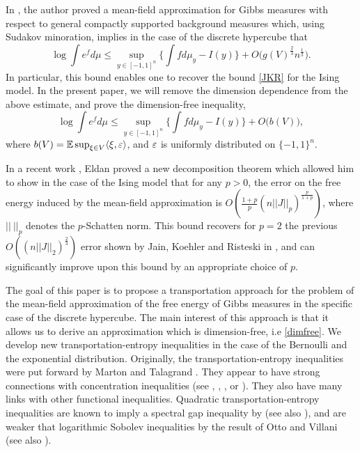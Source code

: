 \documentclass[a4paper,oneside,11pt]{article}
\begin{document}
In \cite{NL}, the author proved a mean-field approximation for Gibbs measures with respect to general compactly supported background measures which, using Sudakov minoration, implies in the case of the discrete hypercube that
$$ \log \int e^{f} d\mu \leq \sup_{ y\in [-1,1]^n} \big\{ \int fd \mu_y - I(y)\big\}  + O\big( g(V)^{\frac{2}{3}} n^{\frac{1}{3}}\big).$$
In particular, this bound enables one to recover the bound \eqref{JKR} for the Ising model. In the present paper, we will remove the dimension dependence from the above estimate, and prove the dimension-free inequality,
\begin{equation}\label{dimfree} \log \int e^{f} d\mu \leq \sup_{ y\in [-1,1]^n} \big\{ \int fd \mu_y - I(y)\big\}  + O\big(b(V)\big),\end{equation}
where $b(V) = \mathbb{E} \sup_{\xi \in V} \langle \xi, \varepsilon\rangle$, and $\varepsilon$ is uniformly distributed on $\{-1,1\}^n$.

In a recent work \cite{Eldanmean}, Eldan proved a new decomposition theorem which allowed him to show in the case of the Ising model that for any $p>0$, the error on the free energy induced by the mean-field approximation is $O( \frac{1+p}{p} (n||J||_p)^{\frac{p}{1+p}})$, where $|| \ ||_p$ denotes the $p$-Schatten norm. This bound recovers for $p=2$ the previous $O((n ||J||_2)^{\frac{2}{3}})$ error shown by  Jain, Koehler and Risteski in \cite{JKR}, and can significantly improve upon this bound by an appropriate choice of $p$.





The goal of this paper is to propose a transportation approach for the problem of the mean-field approximation of the free energy of Gibbs measures in the specific case of the discrete hypercube. The main interest of this approach is that it allows us to derive an approximation which is dimension-free, i.e \eqref{dimfree}. We develop new transportation-entropy inequalities in the case of the Bernoulli and the exponential distribution. 
Originally, the transportation-entropy inequalities were put forward by Marton \cite{Marton} and Talagrand \cite{Talagrand2}. They appear to have strong connections with concentration inequalities (see  \cite[Chapter 6]{Ledouxmono}, \cite{Dembo}, \cite[Chapter 8]{BLM}, or \cite[section 4]{GL}). They also have many links with other functional inequalities. Quadratic transportation-entropy inequalities are known to imply a spectral gap inequality by \cite[section 4.1]{BGL} (see also \cite[section 8.3]{GL}), and are weaker that logarithmic Sobolev inequalities by the result of Otto and Villani \cite{OV} (see also \cite{BGL}).
\end{document}
